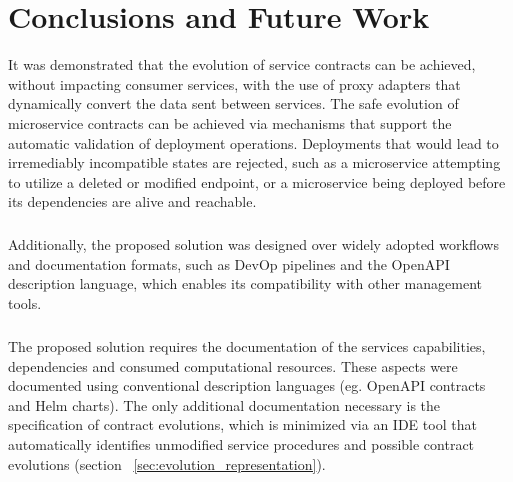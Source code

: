 
%

\chapter{Conclusions and Future Work}
\label{cha:conclusions and future work}

It was demonstrated that the evolution of service contracts can be achieved, without impacting consumer services,
with the use of proxy adapters that dynamically convert the data sent between services.
The safe evolution of microservice contracts can be achieved via mechanisms that
support the automatic validation of deployment operations.
Deployments that would lead to irremediably incompatible states are rejected, such as a
microservice attempting to utilize a deleted or modified endpoint, or a microservice being deployed before its dependencies are alive and reachable.

\paragraph{}

Additionally, the proposed solution was designed over widely adopted workflows and documentation formats, such as DevOp pipelines and the OpenAPI description language,
which enables its compatibility with other management tools.
    
\paragraph{}

The proposed solution requires the documentation of the services capabilities, dependencies and consumed computational resources.
These aspects were documented using conventional description languages (eg. OpenAPI contracts and Helm charts).
The only additional documentation necessary is the specification of contract evolutions, which is minimized
via an IDE tool that automatically identifies unmodified service procedures and possible contract evolutions (section ~\ref{sec:evolution_representation}).

\paragraph{}


